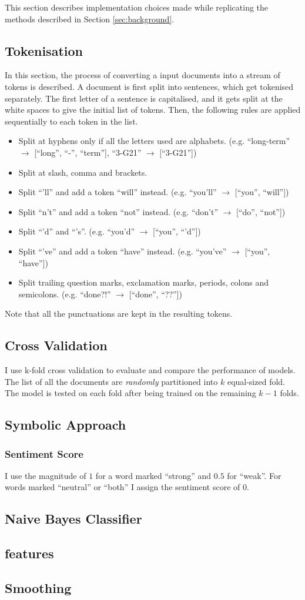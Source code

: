 This section describes implementation choices made while replicating the methods described in Section \ref{sec:background}.
\subsection{Tokenisation}
In this section, the process of converting a input documents into a stream of tokens is described.
A document is first split into sentences, which get tokenised separately.
The first letter of a sentence is capitalised, and it gets split at the white spaces to give the initial list of tokens.
Then, the following rules are applied sequentially to each token in the list.
\begin{itemize}
\item Split at hyphens only if all the letters used are alphabets.
(e.g. ``long-term'' $\rightarrow$ [``long'', ``-'', ``term''], ``3-G21'' $\rightarrow$ [``3-G21''])
\item Split at slash, comma and brackets.
\item Split ``'ll'' and add a token ``will'' instead.
(e.g. ``you'll'' $\rightarrow$ [``you'', ``will''])
\item Split ``n't'' and add a token ``not'' instead.
(e.g. ``don't'' $\rightarrow$ [``do'', ``not''])
\item Split ``'d'' and ``'s''.
(e.g. ``you'd'' $\rightarrow$ [``you'', ``'d''])
\item Split ``'ve'' and add a token ``have'' instead.
(e.g. ``you've'' $\rightarrow$ [``you'', ``have''])
\item Split trailing question marks, exclamation marks, periods, colons and semicolons.
(e.g. ``done?!'' $\rightarrow$ [``done'', ``??''])
\end{itemize}
Note that all the punctuations are kept in the resulting tokens.
\subsection{Cross Validation}
I use k-fold cross validation to evaluate and compare the performance of models.
The list of all the documents are {\em randomly} partitioned into $k$ equal-sized fold.
The model is tested on each fold after being trained on the remaining $k-1$ folds.
\subsection{Symbolic Approach}
\subsubsection{Sentiment Score}
I use the magnitude of $1$ for a word marked ``strong'' and $0.5$ for ``weak''. For words marked ``neutral'' or ``both'' I assign the sentiment score of $0$.
\subsection{Naive Bayes Classifier}
\subsection{features}
\subsection{Smoothing}
